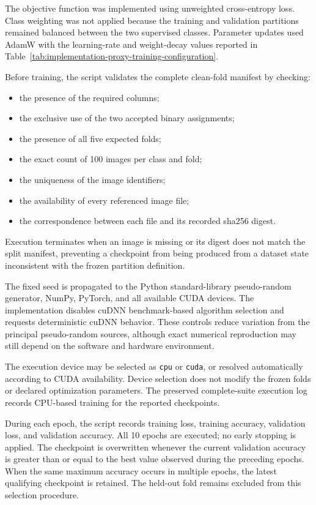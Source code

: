 The objective function was implemented using unweighted cross-entropy loss.
Class weighting was not applied because the training and validation partitions
remained balanced between the two supervised classes. Parameter updates used
AdamW with the learning-rate and weight-decay values reported in
Table~\ref{tab:implementation-proxy-training-configuration}.

Before training, the script validates the complete clean-fold manifest by
checking:

\begin{itemize}
\item the presence of the required columns;
\item the exclusive use of the two accepted binary assignments;
\item the presence of all five expected folds;
\item the exact count of 100 images per class and fold;
\item the uniqueness of the image identifiers;
\item the availability of every referenced image file;
\item the correspondence between each file and its recorded
\gls{sha256} digest.
\end{itemize}

Execution terminates when an image is missing or its digest does not match the
split manifest, preventing a checkpoint from being produced from a dataset
state inconsistent with the frozen partition definition.

The fixed seed is propagated to the Python standard-library pseudo-random
generator, NumPy, PyTorch, and all available CUDA devices. The implementation
disables cuDNN benchmark-based algorithm selection and requests deterministic
cuDNN behavior. These controls reduce variation from the principal
pseudo-random sources, although exact numerical reproduction may still depend
on the software and hardware environment.

The execution device may be selected as \texttt{cpu} or \texttt{cuda}, or
resolved automatically according to CUDA availability. Device selection does
not modify the frozen folds or declared optimization parameters. The preserved
complete-suite execution log records CPU-based training for the reported
checkpoints.

During each epoch, the script records training loss, training accuracy,
validation loss, and validation accuracy. All 10 epochs are executed; no early
stopping is applied. The checkpoint is overwritten whenever the current
validation accuracy is greater than or equal to the best value observed during
the preceding epochs. When the same maximum accuracy occurs in multiple
epochs, the latest qualifying checkpoint is retained. The held-out fold remains
excluded from this selection procedure.

